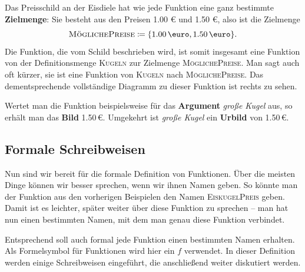 \documentclass[../../main.tex]{subfiles}
\begin{document}
\begin{example}{}
    Das Preisschild an der Eisdiele hat wie jede Funktion eine ganz bestimmte \textbf{Zielmenge}: Sie besteht aus den Preisen 1.00 \euro{} und 1.50 \euro, also ist die Zielmenge \[\textsc{MöglichePreise}\coloneqq\{\text{1.00\,\euro},\text{1.50\,\euro}\}.\]
    Die Funktion, die vom Schild beschrieben wird, ist somit insgesamt eine Funktion von der Definitionsmenge \textsc{Kugeln} zur Zielmenge \textsc{MöglichePreise}. Man sagt auch oft kürzer, sie ist eine Funktion von \textsc{Kugeln} nach \textsc{MöglichePreise}. Das dementsprechende vollständige Diagramm zu dieser Funktion ist rechts zu sehen.
    
    Wertet man die Funktion beispielsweise für das \textbf{Argument} \emph{große Kugel} aus, so erhält man das \textbf{Bild} 1.50\,\euro. Umgekehrt ist \emph{große Kugel} ein \textbf{Urbild} von 1.50\,\euro.
\end{example}


\subsection*{Formale Schreibweisen}
\label{sec:abbildungen_definition}
Nun sind wir bereit für die formale Definition von Funktionen. Über die meisten Dinge können wir besser sprechen, wenn wir ihnen Namen geben. So könnte man der Funktion aus den vorherigen Beispielen den Namen \textsc{EiskugelPreis} geben. Damit ist es leichter, später weiter über diese Funktion zu sprechen -- man hat nun einen bestimmten Namen, mit dem man genau diese Funktion verbindet.

Entsprechend soll auch formal jede Funktion einen bestimmten Namen erhalten. Als Formelsymbol für Funktionen wird hier ein $f$ verwendet. In dieser Definition werden einige Schreibweisen eingeführt, die anschließend weiter diskutiert werden.
\end{document}
